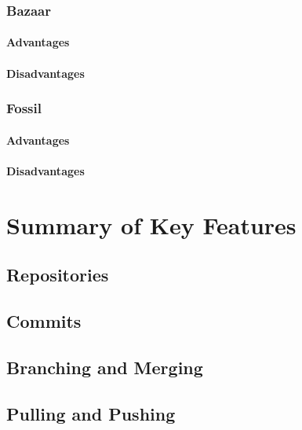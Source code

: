 \subsubsection{Bazaar}
\paragraph{Advantages}
\paragraph{Disadvantages}
\subsubsection{Fossil}
\paragraph{Advantages}
\paragraph{Disadvantages}
\section{Summary of Key Features}
\subsection{Repositories}
\subsection{Commits}
\subsection{Branching and Merging}
\subsection{Pulling and Pushing}
